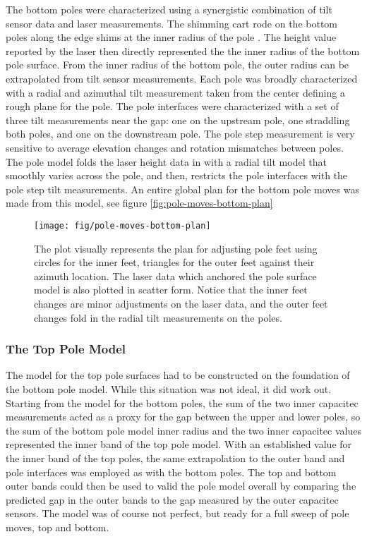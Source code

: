 The bottom poles were characterized using a synergistic combination of tilt sensor data and laser measurements.  The shimming cart rode on the bottom poles along the edge shims at the inner radius of the pole . The height value reported by the laser then directly represented the the inner radius of the bottom pole surface.  From the inner radius of the bottom pole, the outer radius can be extrapolated from tilt sensor measurements.  Each pole was broadly characterized with a radial and azimuthal tilt measurement taken from the center defining a rough plane for the pole.  The pole interfaces were characterized with a set of three tilt measurements near the gap: one on the upstream pole, one straddling both poles, and one on the downstream pole.  The pole step measurement is very sensitive to average elevation changes and rotation mismatches between poles.  The pole model folds the laser height data in with a radial tilt model that smoothly varies across the pole, and then, restricts the pole interfaces with the pole step tilt measurements.  An entire global plan for the bottom pole moves was made from this model, see figure \ref{fig:pole-moves-bottom-plan}

\begin{figure}
\texttt{[image: fig/pole-moves-bottom-plan]}
\caption{The plot visually represents the plan for adjusting pole feet using circles for the inner feet, triangles for the outer feet against their azimuth location.  The laser data which anchored the pole surface model is also plotted in scatter form.  Notice that the inner feet changes are minor adjustments on the laser data, and the outer feet changes fold in the radial tilt measurements on the poles.}
\label{fig:bottom-pole-adjustment-plan}
\end{figure}

\subsubsection{The Top Pole Model}

The model for the top pole surfaces had to be constructed on the foundation of the bottom pole model.  While this situation was not ideal, it did work out.  Starting from the model for the bottom poles, the sum of the two inner capacitec measurements acted as a proxy for the gap between the upper and lower poles, so the sum of the bottom pole model inner radius and the two inner capacitec values represented the inner band of the top pole model.  With an established value for the inner band of the top poles, the same extrapolation to the outer band and pole interfaces was employed as with the bottom poles.  The top and bottom outer bands could then be used to valid the pole model overall by comparing the predicted gap in the outer bands to the gap measured by the outer capacitec sensors.  The model was of course not perfect, but ready for a full sweep of pole moves, top and bottom.

